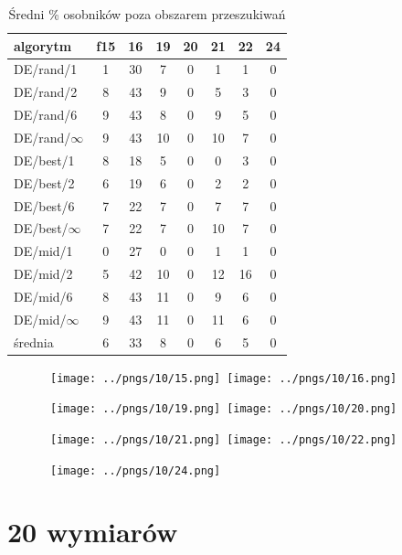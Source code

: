 \documentclass[a4paper,onecolumn,oneside,11pt,wide,floatssmall]{mwrep}
\theoremstyle{definition}
\theoremstyle{plain}%
\theoremstyle{remark}
\begin{document}
\begin{table}[H]
\centering
\begin{tabular}{ l | c | c | c | c | c | c | c }
algorytm         &f15& 16& 19& 20& 21& 22& 24 \\ \hline
DE/rand/1	 & 1 & 30 & 7 & 0 & 1 & 1 & 0 \\
DE/rand/2	 & 8 & 43 & 9 & 0 & 5 & 3 & 0 \\
DE/rand/6	 & 9 & 43 & 8 & 0 & 9 & 5 & 0 \\
DE/rand/$\infty$ & 9 & 43 & 10 & 0 & 10 & 7 & 0 \\
DE/best/1	 & 8 & 18 & 5 & 0 & 0 & 3 & 0 \\
DE/best/2	 & 6 & 19 & 6 & 0 & 2 & 2 & 0 \\
DE/best/6	 & 7 & 22 & 7 & 0 & 7 & 7 & 0 \\
DE/best/$\infty$ & 7 & 22 & 7 & 0 & 10 & 7 & 0 \\
DE/mid/1         & 0 & 27 & 0 & 0 & 1 & 1 & 0 \\
DE/mid/2	 & 5 & 42 & 10 & 0 & 12 & 16 & 0 \\
DE/mid/6	 & 8 & 43 & 11 & 0 & 9 & 6 & 0 \\
DE/mid/$\infty$	 & 9 & 43 & 11 & 0 & 11 & 6 & 0 \\ \hline
średnia          & 6 & 33 & 8 & 0 & 6 & 5 & 0 \\              
\end{tabular}
\caption{Średni \% osobników poza obszarem przeszukiwań}
\end{table}

\begin{figure}[H]
\centering
\mbox{
\texttt{[image: ../pngs/10/15.png]} \quad
\texttt{[image: ../pngs/10/16.png]} 
}
\end{figure}

\begin{figure}[H]
\centering
\mbox{
\texttt{[image: ../pngs/10/19.png]} \quad
\texttt{[image: ../pngs/10/20.png]} 
}
\end{figure}

\begin{figure}[H]
\centering
\mbox{
\texttt{[image: ../pngs/10/21.png]} \quad
\texttt{[image: ../pngs/10/22.png]} 
}
\end{figure}

\begin{figure}[H]
\centering
\mbox{
\texttt{[image: ../pngs/10/24.png]}
}
\end{figure}

\section{20 wymiarów}
\end{document}
